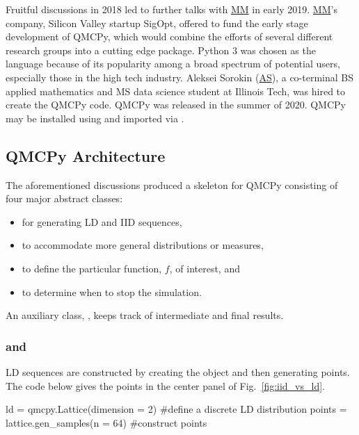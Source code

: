 \documentclass[11pt]{NSFamsart}
\newcommand{\MM}{\hyperlink{MMlink}{MM}\xspace}
\newcommand{\AS}{\hyperlink{ASlink}{AS}\xspace}
\begin{document}
Fruitful discussions in 2018 led to further talks with \MM in early 2019.  \MM's company, Silicon Valley startup SigOpt, offered to fund the early stage development of  QMCPy, which would combine the efforts of several different research groups into a cutting edge package. Python 3 was chosen as the language because of its popularity among a broad spectrum of potential users, especially those in the high tech industry.  \hypertarget{ASlink}{Aleksei Sorokin} (\AS),  a co-terminal BS applied mathematics and MS data science student at Illinois Tech, was hired to create the QMCPy code.  QMCPy was released in the summer of 2020.  QMCPy may be installed using  and imported via .


\subsection{QMCPy Architecture}

The aforementioned discussions produced a skeleton for QMCPy consisting of four major abstract classes:
\begin{itemize}
	\item {} for generating LD and IID sequences,
	\item {} to accommodate more general distributions or measures,
	\item {} to define the particular function, $f$, of interest, and
	\item {} to determine when to stop the simulation.
\end{itemize}
An auxiliary class, , keeps track of intermediate and final results.

\subsubsection{\textup{ and }} LD sequences are constructed by creating the object and then generating points.  The code below gives the points in the center panel of Fig.\ \ref{fig:iid_vs_ld}.
\begin{pythoncode}
ld = qmcpy.Lattice(dimension = 2)  #define a discrete LD distribution
points = lattice.gen_samples(n = 64)  #construct points
\end{pythoncode}
\end{document}
